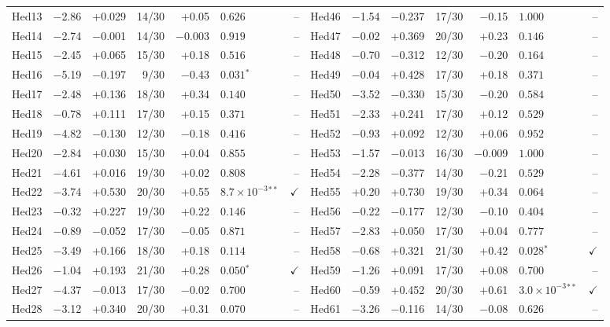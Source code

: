 \begin{table}[htbp]
{\begin{tabular}{rrrrrlr@{\hspace{6pt}}rrrrrlr}
    Hed13 & −2.86 & +0.029 & 14/30 & +0.05 & $0.626$ & -- & Hed46 & −1.54 & −0.237 & 17/30 & −0.15 & $1.000$ & -- \\
    Hed14 & −2.74 & −0.001 & 14/30 & −0.003 & $0.919$ & -- & Hed47 & −0.02 & +0.369 & 20/30 & +0.23 & $0.146$ & -- \\
    Hed15 & −2.45 & +0.065 & 15/30 & +0.18 & $0.516$ & -- & Hed48 & −0.70 & −0.312 & 12/30 & −0.20 & $0.164$ & -- \\
    Hed16 & −5.19 & −0.197 & 9/30 & −0.43 & $0.031{}^{*}$ & -- & Hed49 & −0.04 & +0.428 & 17/30 & +0.18 & $0.371$ & -- \\
    Hed17 & −2.48 & +0.136 & 18/30 & +0.34 & $0.140$ & -- & Hed50 & −3.52 & −0.330 & 15/30 & −0.20 & $0.584$ & -- \\
    Hed18 & −0.78 & +0.111 & 17/30 & +0.15 & $0.371$ & -- & Hed51 & −2.33 & +0.241 & 17/30 & +0.12 & $0.529$ & -- \\
    Hed19 & −4.82 & −0.130 & 12/30 & −0.18 & $0.416$ & -- & Hed52 & −0.93 & +0.092 & 12/30 & +0.06 & $0.952$ & -- \\
    Hed20 & −2.84 & +0.030 & 15/30 & +0.04 & $0.855$ & -- & Hed53 & −1.57 & −0.013 & 16/30 & −0.009 & $1.000$ & -- \\
    Hed21 & −4.61 & +0.016 & 19/30 & +0.02 & $0.808$ & -- & Hed54 & −2.28 & −0.377 & 14/30 & −0.21 & $0.529$ & -- \\
    Hed22 & −3.74 & +0.530 & 20/30 & +0.55 & $8.7\times 10^{-3}{}^{**}$ & $\checkmark$ & Hed55 & +0.20 & +0.730 & 19/30 & +0.34 & $0.064$ & -- \\
    Hed23 & −0.32 & +0.227 & 19/30 & +0.22 & $0.146$ & -- & Hed56 & −0.22 & −0.177 & 12/30 & −0.10 & $0.404$ & -- \\
    Hed24 & −0.89 & −0.052 & 17/30 & −0.05 & $0.871$ & -- & Hed57 & −2.83 & +0.050 & 17/30 & +0.04 & $0.777$ & -- \\
    Hed25 & −3.49 & +0.166 & 18/30 & +0.18 & $0.114$ & -- & Hed58 & −0.68 & +0.321 & 21/30 & +0.42 & $0.028{}^{*}$ & $\checkmark$ \\
    Hed26 & −1.04 & +0.193 & 21/30 & +0.28 & $0.050{}^{*}$ & $\checkmark$ & Hed59 & −1.26 & +0.091 & 17/30 & +0.08 & $0.700$ & -- \\
    Hed27 & −4.37 & −0.013 & 17/30 & −0.02 & $0.700$ & -- & Hed60 & −0.59 & +0.452 & 20/30 & +0.61 & $3.0\times 10^{-3}{}^{**}$ & $\checkmark$ \\
    Hed28 & −3.12 & +0.340 & 20/30 & +0.31 & $0.070$ & -- & Hed61 & −3.26 & −0.116 & 14/30 & −0.08 & $0.626$ & -- \\

\end{tabular}}
\end{table}
